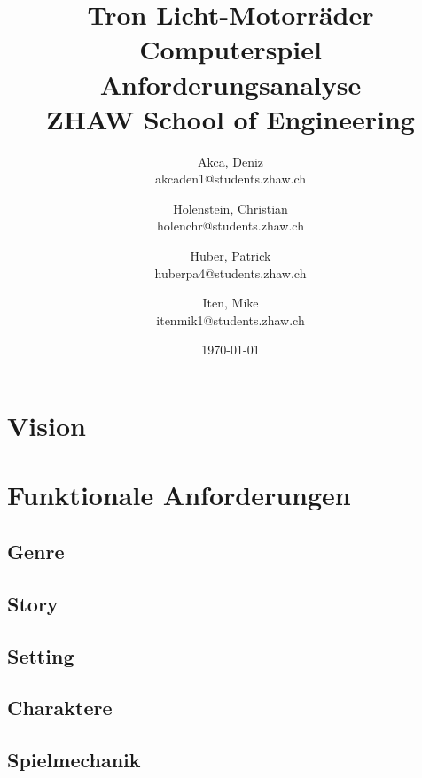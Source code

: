 \documentclass[11pt,ngerman]{article}
\begin{document}
    \title{Tron Licht-Motorräder Computerspiel\\
        \vspace{1cm}
        \smaller{}Anforderungsanalyse \\
        \vspace{0.5cm}
        \small{}ZHAW  School of Engineering
        \vspace{1.5cm}
    }
    \author{
        Akca, Deniz\\
        \small{akcaden1@students.zhaw.ch}
        \and
        Holenstein, Christian\\
        \small{holenchr@students.zhaw.ch}
        \and
        Huber, Patrick\\
        \small{huberpa4@students.zhaw.ch}
        \and
        Iten, Mike\\
        \small{itenmik1@students.zhaw.ch}
        \vspace{1.5cm}
    }
   \date{\today}

    \maketitle
    \newpage

    \tableofcontents
    \newpage

    \section{Vision}


    \section{Funktionale Anforderungen}

        \subsection{Genre}
        \subsection{Story}
        \subsection{Setting}
        \subsection{Charaktere}
        \subsection{Spielmechanik}
\end{document}
